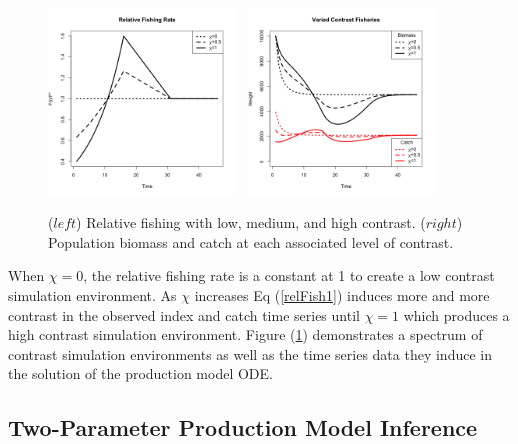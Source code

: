 %
\begin{figure}[h!]
\centering
\includegraphics[width=0.44\textwidth]{../ptNew/relFish.png}
$~$
\includegraphics[width=0.44\textwidth]{../ptNew/relSeries.png}
\vspace{-1cm}
\caption{ \label{catchT45}
($left$) Relative fishing with low, medium, and high contrast.
($right$) Population biomass and catch at each associated level of contrast. %
}
\label{catch45}
\end{figure}
%
When $\chi=0$, the relative fishing rate is a constant at 1 to create a low
contrast simulation environment. As $\chi$ increases Eq (\ref{relFish1})
induces more and more contrast in the observed index and catch time series
until $\chi=1$ which produces a high contrast simulation environment.
Figure (\ref{catch45}) demonstrates a spectrum of contrast simulation
environments as well as the time series data they induce in the solution of
the production model ODE.

\subsection{Two-Parameter Production Model Inference\label{modelFit}}

